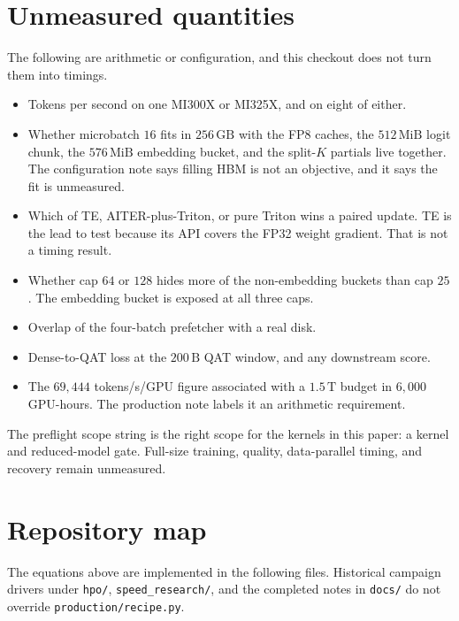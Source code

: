 \documentclass[11pt]{article}
\DeclareRobustCommand{\code}[1]{\texttt{#1}}
\newcommand{\MiB}{\,\mathrm{MiB}}
\begin{document}
\section{Unmeasured quantities}

The following are arithmetic or configuration, and this checkout does not
turn them into timings.

\begin{itemize}
\item Tokens per second on one MI300X or MI325X, and on eight of either.
\item Whether microbatch \(16\) fits in \(256\,\mathrm{GB}\) with the FP8
caches, the \(512\MiB\) logit chunk, the \(576\MiB\) embedding bucket, and
the split-\(K\) partials live together. The configuration note says filling
HBM is not an objective, and it says the fit is unmeasured.
\item Which of TE, AITER-plus-Triton, or pure Triton wins a paired update.
TE is the lead to test because its API covers the FP32 weight gradient. That
is not a timing result.
\item Whether cap \(64\) or \(128\) hides more of the non-embedding buckets
than cap \(25\). The embedding bucket is exposed at all three caps.
\item Overlap of the four-batch prefetcher with a real disk.
\item Dense-to-QAT loss at the \(200\,\mathrm{B}\) QAT window, and any
downstream score.
\item The \(69{,}444\) tokens/s/GPU figure associated with a \(1.5\,\mathrm{T}\)
budget in \(6{,}000\) GPU-hours. The production note labels it an arithmetic
requirement.
\end{itemize}

The preflight scope string is the right scope for the kernels in this paper:
a kernel and reduced-model gate. Full-size training, quality, data-parallel
timing, and recovery remain unmeasured.

\section{Repository map}

The equations above are implemented in the following files. Historical
campaign drivers under \code{hpo/}, \code{speed\_research/}, and the completed
notes in \code{docs/} do not override \code{production/recipe.py}.
\end{document}

